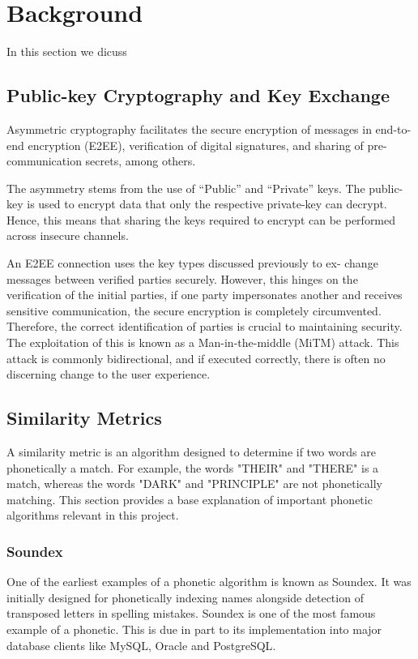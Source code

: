 \section{Background}
In this section we dicuss

\subsection{Public-key Cryptography and Key Exchange}
Asymmetric cryptography facilitates the secure encryption of messages
in end-to-end encryption (E2EE), verification of digital signatures, and
sharing of pre-communication secrets, among others.

The asymmetry stems from the use of ``Public'' and ``Private'' keys. The
public-key is used to encrypt data that only the respective private-key
can decrypt. Hence, this means that sharing the keys required to encrypt
can be performed across insecure channels.

An E2EE connection uses the key types discussed previously to ex-
change messages between verified parties securely. However, this hinges
on the verification of the initial parties, if one party impersonates another and receives sensitive communication, the secure encryption is
completely circumvented. Therefore, the correct identification of parties is crucial to maintaining security. The exploitation of this is known as a Man-in-the-middle (MiTM) attack. This attack is commonly bidirectional, and if executed correctly, there is often no discerning change to the user experience.

\subsection{Similarity Metrics}
\label{sec:similarity_metric}
A similarity metric is an algorithm designed to determine if two words are phonetically a match. For example, the words "THEIR" and "THERE" is a match, whereas the words "DARK" and "PRINCIPLE" are not phonetically matching. This section provides a base explanation of important phonetic algorithms relevant in this project.

\subsubsection*{Soundex}
\label{sec:soundex}
One of the earliest examples of a phonetic algorithm is known as Soundex. It was initially designed for phonetically indexing names alongside detection of transposed letters in spelling mistakes.  Soundex is one of the most famous example of a phonetic. This is due in part to its implementation into major database clients like MySQL\cite{mysql_soundex}, Oracle\cite{moved_2005} and PostgreSQL\cite{postgresql}.

